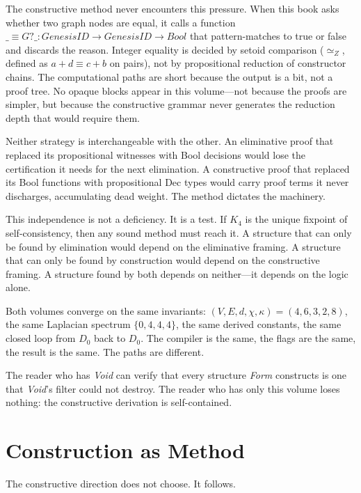 \documentclass[11pt,a4paper]{book}
\def\mathbb#1{#1}%
\def\texttt#1{#1}%
\def\text#1{#1}%
\begin{document}
The constructive method never encounters this pressure. When this book asks whether two graph nodes are equal, it calls a function $\texttt{\_}\!\equiv\!\texttt{G?\_} : \text{GenesisID} \to \text{GenesisID} \to \text{Bool}$ that pattern-matches to \texttt{true} or \texttt{false} and discards the reason. Integer equality is decided by setoid comparison ($\simeq_{\mathbb{Z}}$, defined as $a + d \equiv c + b$ on pairs), not by propositional reduction of constructor chains. The computational paths are short because the output is a bit, not a proof tree. No \texttt{opaque} blocks appear in this volume---not because the proofs are simpler, but because the constructive grammar never generates the reduction depth that would require them.

Neither strategy is interchangeable with the other. An eliminative proof that replaced its propositional witnesses with Bool decisions would lose the certification it needs for the next elimination. A constructive proof that replaced its Bool functions with propositional Dec types would carry proof terms it never discharges, accumulating dead weight. The method dictates the machinery.

This independence is not a deficiency. It is a test. If $K_4$ is the unique fixpoint of self-consistency, then any sound method must reach it. A structure that can only be found by elimination would depend on the eliminative framing. A structure that can only be found by construction would depend on the constructive framing. A structure found by both depends on neither---it depends on the logic alone.

Both volumes converge on the same invariants: $(V,E,d,\chi,\kappa) = (4,6,3,2,8)$, the same Laplacian spectrum $\{0,4,4,4\}$, the same derived constants, the same closed loop from $D_0$ back to $D_0$. The compiler is the same, the flags are the same, the result is the same. The paths are different.

The reader who has \textit{Void} can verify that every structure \textit{Form} constructs is one that \textit{Void}'s filter could not destroy. The reader who has only this volume loses nothing: the constructive derivation is self-contained.

\section*{Construction as Method}

The constructive direction does not choose. It follows.
\end{document}
